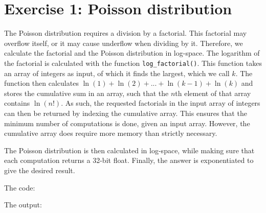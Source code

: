 \section{Exercise 1: Poisson distribution}

The Poisson distribution requires a division by a factorial. This factorial may overflow itself, or it may cause underflow when
dividing by it. Therefore, we calculate the factorial and the Poisson distribution in log-space. The logarithm of the factorial
is calculated with the function \texttt{log\_factorial()}. This function takes an array of integers as input, of which it finds 
the largest, which we call $k$. The function then calculates $\ln(1) + \ln(2) + ... + \ln(k - 1) + \ln(k)$ and stores the cumulative
sum in an array, such that the $n$th element of that array contains $\ln(n!)$. As such, the requested factorials in the input array
of integers can then be returned by indexing the cumulative array. This ensures that the minimum number of computations is done, given
an input array. However, the cumulative array does require more memory than strictly necessary.

The Poisson distribution is then calculated in log-space, while making sure that each computation returns a 32-bit float. Finally, the
answer is exponentiated to give the desired result.

\noindent The code:



\noindent The output:


